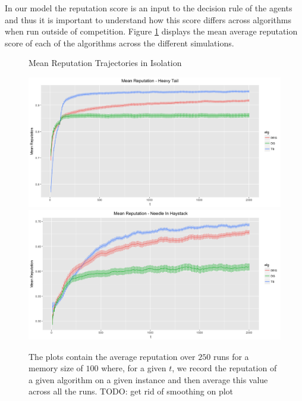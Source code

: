 \documentclass{article}
\theoremstyle{definition}
\begin{document}
In our model the reputation score is an input to the decision rule of the agents and thus it is important to understand how this score differs across algorithms when run outside of competition. Figure \ref{prelim_means} displays the mean average reputation score of each of the algorithms across the different simulations.

\begin{figure}
\caption{Mean Reputation Trajectories in Isolation}
\includegraphics[scale=0.2]{"figures/heavy_tail_iso_mean"}
\includegraphics[scale=0.2]{"figures/nih_iso_mean"}
\label{prelim_means}
\caption*{\tiny{The plots contain the average reputation over $250$ runs for a memory size of $100$ where, for a given $t$, we record the reputation of a given algorithm on a given instance and then average this value across all the runs. TODO: get rid of smoothing on plot}}
\end{figure}
\end{document}
